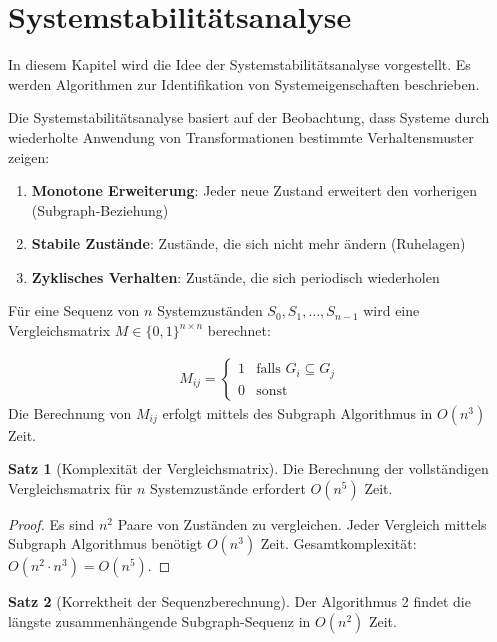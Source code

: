 \documentclass[a4paper,12pt]{article}
\theoremstyle{definition}
\newtheorem{satz}{Satz}
\begin{document}
\section{Systemstabilitätsanalyse}
In diesem Kapitel wird die Idee der Systemstabilitätsanalyse vorgestellt. Es werden Algorithmen zur Identifikation von Systemeigenschaften beschrieben.

Die Systemstabilitätsanalyse basiert auf der Beobachtung, dass Systeme durch wiederholte Anwendung von Transformationen bestimmte Verhaltensmuster zeigen:

\begin{enumerate}
	\item \textbf{Monotone Erweiterung}: Jeder neue Zustand erweitert den vorherigen (Subgraph-Beziehung)
	\item \textbf{Stabile Zustände}: Zustände, die sich nicht mehr ändern (Ruhelagen)
	\item \textbf{Zyklisches Verhalten}: Zustände, die sich periodisch wiederholen
\end{enumerate}

Für eine Sequenz von $n$ Systemzuständen $S_0, S_1, \ldots, S_{n-1}$ wird eine Vergleichsmatrix $M \in \{0,1\}^{n \times n}$ berechnet:

\begin{align}
	M_{ij} = \begin{cases}
		1 & \text{falls } G_i \subseteq G_j \\
		0 & \text{sonst}
	\end{cases}
\end{align}
Die Berechnung von $M_{ij}$ erfolgt mittels des Subgraph Algorithmus in $O(n^3)$ Zeit.

\begin{satz}[Komplexität der Vergleichsmatrix]
	Die Berechnung der vollständigen Vergleichsmatrix für $n$ Systemzustände erfordert $O(n^5)$ Zeit.
\end{satz}

\begin{proof}
	Es sind $n^2$ Paare von Zuständen zu vergleichen. Jeder Vergleich mittels Subgraph Algorithmus benötigt $O(n^3)$ Zeit. Gesamtkomplexität: $O(n^2 \cdot n^3) = O(n^5)$.
\end{proof}

\begin{satz}[Korrektheit der Sequenzberechnung]
	Der Algorithmus 2 findet die längste zusammenhängende Subgraph-Sequenz in $O(n^2)$ Zeit.
\end{satz}
\end{document}
